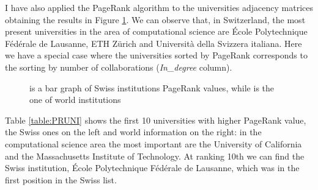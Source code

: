 \documentclass[]{usiinfbachelorproject}
\begin{document}
I have also applied the PageRank algorithm to the universities adjacency matrices obtaining the results in Figure \ref{fig:PRUniversities}.
We can observe that, in Switzerland, the most present universities in the area of computational science are \'{E}cole Polytechnique F\'{e}d\'{e}rale de Lausanne, ETH Z\"{u}rich and Universit\`{a} della Svizzera italiana. Here we have a special case where the universities sorted by PageRank corresponds to the  sorting by number of collaborations (\textit{In\_degree} column).
\begin{figure}[bt]
	\centering
	\caption{  is a bar graph of Swiss institutions PageRank values, while   is the one of world institutions}
	\label{fig:PRUniversities}
\end{figure}


Table \ref{table:PRUNI} shows the first 10 universities with higher PageRank value, the Swiss ones on the left and world information on the right: in the computational science area the most important are the University of California and the Massachusetts Institute of Technology. At ranking 10th we can find the Swiss institution, \'{E}cole Polytechnique F\'{e}d\'{e}rale de Lausanne, which was in the first position in the Swiss list.
\end{document}
